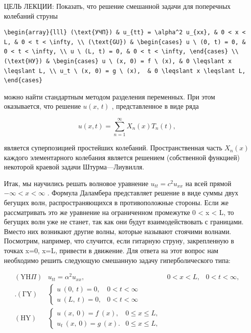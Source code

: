 \documentclass[
  ukrainian,
]{article}
\begin{document}
ЦЕЛЬ ЛЕКЦИИ: Показать, что решение смешанной задачи для поперечных
колебаний струны

\begin{verbatim}
\begin{array}{lll} (\text{УЧП}) & u_{tt} = \alpha^2 u_{xx}, & 0 < x < L, & 0 < t < \infty, \\ (\text{GU}) & \begin{cases} u \ (0, t) = 0, & 0 < t < \infty, \\ u \ (L, t) = 0, & 0 < t < \infty, \end{cases} \\ (\text{НУ}) & \begin{cases} u \ (x, 0) = f \ (x), & 0 \leqslant x \leqslant L, \\ u_t \ (x, 0) = g \ (x),  & 0 \leqslant x \leqslant L, \end{cases}
\end{verbatim}

можно найти стандартным методом разделения переменных. При этом
оказывается, что решение \(u\left(x,\,t\right)\) , представленное в виде
ряда

\[
u(x, t) = \sum_{n=1}^{\infty} X_n(x) T_n(t),
\]

является суперпозицией простейших колебаний. Пространственная часть
\(X_n(x)\) каждого элементарного колебания является решением
(собственной функцией) некоторой краевой задачи Штурма---Лиувилля.

Итак, мы научились решать волновое уравнение \(u_{tt}=c^2u_{xx}\) на
всей прямой \(-\infty < x < \infty\) . Формула Даламбера представляет
решение в виде суммы двух бегущих волн, распространяющихся в
противоположные стороны. Если же рассматривать это же уравнение на
ограниченном промежутке 0 \textless{} x \textless{} L, то бегущих волн
уже не станет, так как они будут взаимодействовать с границами. Вместо
них возникают другие волны, которые называют стоячими волнами.
Посмотрим, например, что случится, если гитарную струну, закрепленную в
точках x=0, x=L, привести в движение. Для ответа на этот вопрос нам
необходимо решить следующую смешанную задачу гиперболического типа:

\[
\begin{array}{lll} (\mathrm{Y}\mathrm{H}\Pi) & u_{tt} = \alpha^2 u_{xx}, & 0 < x < L, & 0 < t < \infty, \\ . (\mathrm{\Gamma}\mathrm{Y}) & \begin{cases} u \ (0, \ t) = 0, & 0 < t < \infty \\ u \ (L, \ t) = 0, & 0 < t < \infty \end{cases} \\ (\mathrm{H}\mathrm{Y}) & \begin{cases} u \ (x, \ 0) = f \ (x), & 0 \leqslant x \leqslant L, \\ u_t \ (x, \ 0) = g \ (x). & 0 \leqslant x \leqslant L, \end{cases} \end{array}
\]
\end{document}
